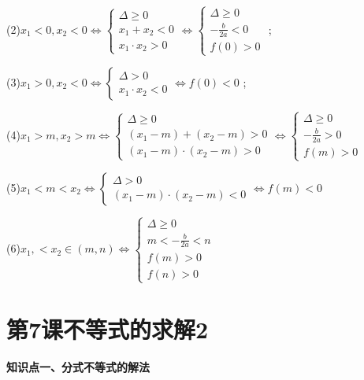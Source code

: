 \documentclass[11pt,a4paper]{ctexbook}
\begin{document}
(2)\quad $\displaystyle x_{1}<0,x_2<0 \Leftrightarrow \left\{
\begin{aligned}
\Delta \ge 0 \\
x_1+x_2<0 \\
x_1 \cdot x_2 > 0
\end{aligned}
\right. 
\Leftrightarrow 
\left\{
\begin{aligned}
\Delta \ge 0 \\
-\frac{b}{2a}<0 \\
f(0) > 0
\end{aligned}
\right. 
$ ;\par
(3)\quad $\displaystyle x_{1}>0,x_2<0 \Leftrightarrow \left\{
\begin{aligned}
\Delta > 0 \\
x_1 \cdot x_2 < 0
\end{aligned}
\right. 
\Leftrightarrow 
f(0) < 0
$ ;\par
(4)\quad $\displaystyle x_{1}>m,x_2>m \Leftrightarrow \left\{
\begin{aligned}
\Delta \ge 0 \\
(x_1-m)+(x_2-m)>0 \\
(x_1-m)\cdot(x_2-m) > 0
\end{aligned}
\right. 
\Leftrightarrow 
\left\{
\begin{aligned}
\Delta \ge 0 \\
-\frac{b}{2a}>0 \\
f(m) > 0
\end{aligned} 
\right. 
$\par
(5)\quad $\displaystyle x_{1}<m<x_2 \Leftrightarrow \left\{
\begin{aligned}
\Delta > 0 \\
(x_1-m)\cdot(x_2-m) < 0
\end{aligned}
\right. 
\Leftrightarrow 
f(m) < 0
$\par
(6)\quad $\displaystyle x_{1},<x_2 \in(m,n) \Leftrightarrow \left\{
\begin{aligned}
\Delta \ge 0 \\
m<-\frac{b}{2a}<n \\
f(m) > 0\\
f(n) > 0
\end{aligned}
\right. 
$

\clearpage
\section{第7课\quad 不等式的求解2}

\begin{formal}
    {\large \textbf{知识点一、分式不等式的解法}}
\end{formal}
\end{document}

